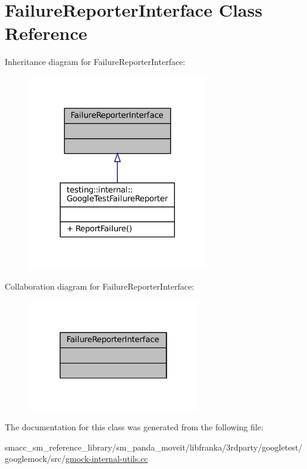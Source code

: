 \hypertarget{classFailureReporterInterface}{}\section{Failure\+Reporter\+Interface Class Reference}
\label{classFailureReporterInterface}


Inheritance diagram for Failure\+Reporter\+Interface\+:
\nopagebreak
\begin{figure}[H]
\begin{center}
\leavevmode
\includegraphics[width=224pt]{classFailureReporterInterface__inherit__graph}
\end{center}
\end{figure}


Collaboration diagram for Failure\+Reporter\+Interface\+:
\nopagebreak
\begin{figure}[H]
\begin{center}
\leavevmode
\includegraphics[width=214pt]{classFailureReporterInterface__coll__graph}
\end{center}
\end{figure}


The documentation for this class was generated from the following file\+:\begin{DoxyCompactItemize}
\item 
smacc\+\_\+sm\+\_\+reference\+\_\+library/sm\+\_\+panda\+\_\+moveit/libfranka/3rdparty/googletest/googlemock/src/\hyperlink{gmock-internal-utils_8cc}{gmock-\/internal-\/utils.\+cc}\end{DoxyCompactItemize}
